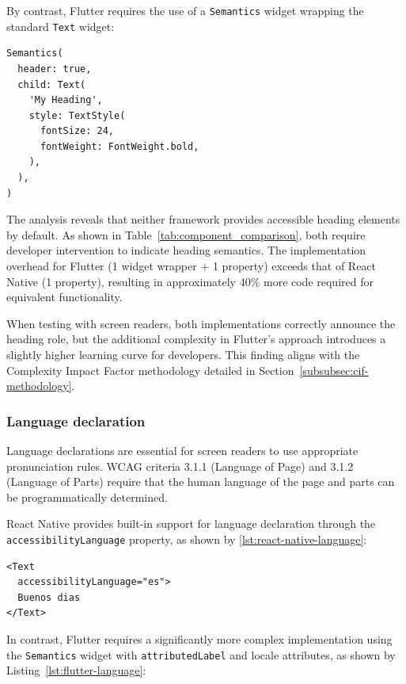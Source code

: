 By contrast, Flutter requires the use of a \texttt{Semantics} widget wrapping the standard \texttt{Text} widget:

\begin{lstlisting}[style=DartStyle, caption=Heading implementation in Flutter, label=lst:flutter-heading]
Semantics(
  header: true,
  child: Text(
    'My Heading',
    style: TextStyle(
      fontSize: 24,
      fontWeight: FontWeight.bold,
    ),
  ),
)
\end{lstlisting}

The analysis reveals that neither framework provides accessible heading elements by default. As shown in Table~\ref{tab:component_comparison}, both require developer intervention to indicate heading semantics. The implementation overhead for Flutter (1 widget wrapper + 1 property) exceeds that of React Native (1 property), resulting in approximately 40\% more code required for equivalent functionality.

When testing with screen readers, both implementations correctly announce the heading role, but the additional complexity in Flutter's approach introduces a slightly higher learning curve for developers. This finding aligns with the Complexity Impact Factor methodology detailed in Section~\ref{subsubsec:cif-methodology}.

\subsubsection{Language declaration}
\label{subsubsec:language-declaration}

Language declarations are essential for screen readers to use appropriate pronunciation rules. WCAG criteria 3.1.1 (Language of Page) and 3.1.2 (Language of Parts) require that the human language of the page and parts can be programmatically determined.

React Native provides built-in support for language declaration through the \\ \texttt{accessibilityLanguage} property, as shown by \ref{lst:react-native-language}:

\begin{lstlisting}[style=ReactNativeStyle, caption=Language declaration in React Native, label=lst:react-native-language]
<Text
  accessibilityLanguage="es">
  Buenos dias
</Text>
\end{lstlisting}

In contrast, Flutter requires a significantly more complex implementation using the \texttt{Semantics} widget with \texttt{attributedLabel} and locale attributes, as shown by Listing~\ref{lst:flutter-language}:

